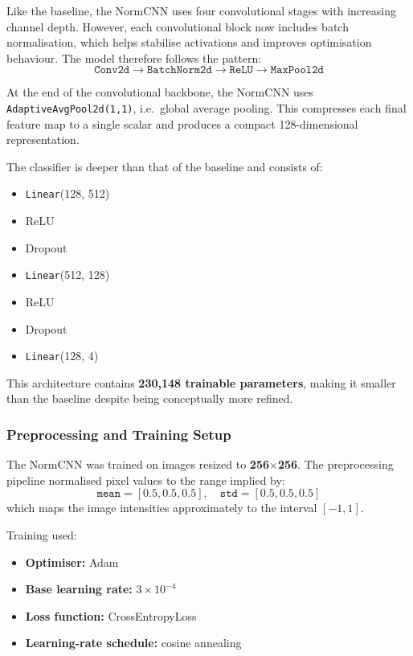 \documentclass{article}
\begin{document}
Like the baseline, the NormCNN uses four convolutional stages with increasing channel depth. However, each convolutional block now includes batch normalisation, which helps stabilise activations and improves optimisation behaviour. The model therefore follows the pattern:
\[\texttt{Conv2d} \rightarrow \texttt{BatchNorm2d} \rightarrow \texttt{ReLU} \rightarrow \texttt{MaxPool2d}\]

At the end of the convolutional backbone, the NormCNN uses \texttt{AdaptiveAvgPool2d(1,1)}, i.e.\ global average pooling. This compresses each final feature map to a single scalar and produces a compact 128-dimensional representation.

The classifier is deeper than that of the baseline and consists of:
\begin{itemize}
    \item \texttt{Linear}(128, 512)
    \item ReLU
    \item Dropout
    \item \texttt{Linear}(512, 128)
    \item ReLU
    \item Dropout
    \item \texttt{Linear}(128, 4)
\end{itemize}

This architecture contains \textbf{230,148 trainable parameters}, making it smaller than the baseline despite being conceptually more refined.

\subsubsection{Preprocessing and Training Setup}

The NormCNN was trained on images resized to \textbf{256$\times$256}. The preprocessing pipeline normalised pixel values to the range implied by:
\[\texttt{mean} = [0.5,0.5,0.5], \quad \texttt{std} = [0.5,0.5,0.5]\]
which maps the image intensities approximately to the interval $[-1,1]$.

Training used:
\begin{itemize}
    \item \textbf{Optimiser:} Adam
    \item \textbf{Base learning rate:} $3\times 10^{-4}$
    \item \textbf{Loss function:} CrossEntropyLoss
    \item \textbf{Learning-rate schedule:} cosine annealing
\end{itemize}
\end{document}
